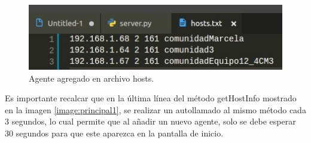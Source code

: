 \FloatBarrier
\begin{figure}[htbp!]
		\centering
	\includegraphics[width=.4 \textwidth]{images/agenteAgregado}
		\caption{Agente agregado en archivo hosts.}		\label{image:agenteAgregado}
\end{figure}
\FloatBarrier

Es importante recalcar que en la última línea del método getHostInfo mostrado en la imagen \ref{image:principal1}, se realizar un autollamado al mismo método cada 3 segundos, lo cual permite que al añadir un nuevo agente, solo se debe esperar 30 segundos para que este aparezca en la pantalla de inicio.
